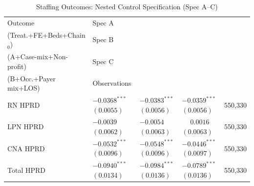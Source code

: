 \begin{table}[H]
\centering
\begin{threeparttable}
\caption{Staffing Outcomes: Nested Control Specification (Spec A--C)}
\label{tab:nested-staffing}
\small
\setlength{\tabcolsep}{6pt}
\begin{tabularx}{\textwidth}{@{} l Y Y Y r @{}}
\toprule
Outcome & Spec A\\(Treat.+FE+Beds+Chain$_{0}$) & Spec B\\(A+Case-mix+Non-profit) & Spec C\\(B+Occ.+Payer mix+LOS) & Observations \\
\midrule
RN HPRD &  &  &  & 550,330 \\
LPN HPRD &  &  &  & 550,330 \\
CNA HPRD &  &  &  & 550,330 \\
Total HPRD &  &  &  & 550,330 \\
\bottomrule
\end{tabularx}


\end{threeparttable}
\end{table}
